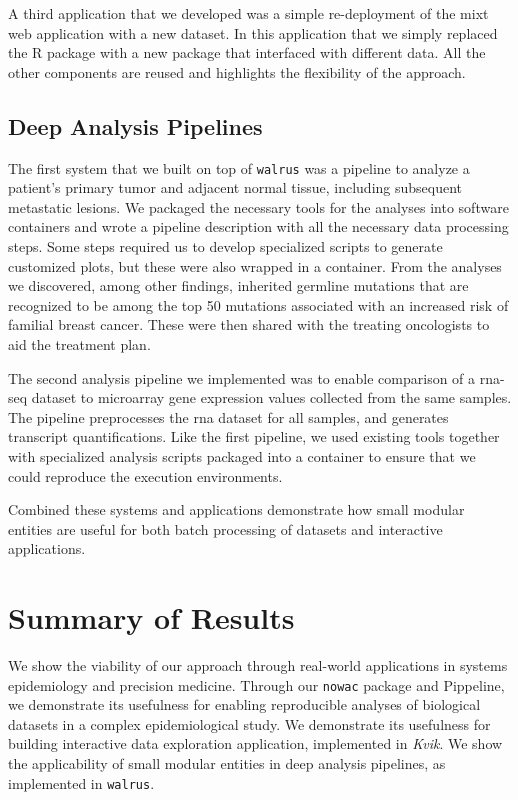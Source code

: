 A third application that we developed was a simple re-deployment of the
\gls{mixt} web application with a new dataset. In this application that we
simply replaced the R package with a new package that interfaced with different
data. All the other components are reused and highlights the flexibility of the
approach. 


\subsection{Deep Analysis Pipelines}
The first system that we built on top of \texttt{walrus} was a pipeline to
analyze a patient’s primary tumor and adjacent normal tissue, including
subsequent metastatic lesions.\cite{walrus} We packaged the necessary tools for
the analyses into software containers and wrote a pipeline description with all
the necessary data processing steps. Some steps required us to develop
specialized scripts to generate customized plots, but these were also wrapped in
a container. From the analyses we discovered, among other findings, inherited
germline mutations that are recognized to be among the top 50 mutations
associated with an increased risk of familial breast cancer. These were then
shared with the treating oncologists to aid the treatment plan. 

The second analysis pipeline we implemented was to enable comparison of a
\gls{rna}-seq dataset to microarray gene expression values collected from the
same samples.  The pipeline preprocesses the \gls{rna} dataset for all samples,
and generates transcript quantifications. Like the first pipeline, we used
existing tools together with specialized analysis scripts packaged into a
container to ensure that we could reproduce the execution environments. 

Combined these systems and applications demonstrate how small modular entities
are useful for both batch processing of datasets and interactive
applications. 

\section{Summary of Results} 
We show the viability of our approach through real-world applications in systems
epidemiology and precision medicine. Through our \texttt{nowac} package and
Pippeline, we demonstrate its usefulness for enabling reproducible analyses of
biological datasets in a complex epidemiological study. We demonstrate its
usefulness for building interactive data exploration application, implemented in
\emph{Kvik}. We show the applicability of small modular entities in deep
analysis pipelines, as implemented in \texttt{walrus}.

